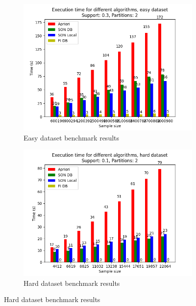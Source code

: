 \documentclass[a4paper]{article}
\begin{document}
	\begin{figure}[h]
		\centering
		\begin{subfigure}[b]{\textwidth}
			\centering
			\includegraphics[width=\textwidth]{1_easy_0,3_2_dataset.png}
         	\caption{Easy dataset benchmark results}
         	\label{fig:1-03sup-2par-ds-e}
		\end{subfigure}
		\hfill		
		\begin{subfigure}[b]{\textwidth}
			\centering
			\includegraphics[width=\textwidth]{1_hard_0,1_2_dataset.png}
         	\caption{Hard dataset benchmark results}
         	\label{fig:1-01sup-2par-ds-h}
		\end{subfigure}
		\hfill
		
	\end{figure}
	
\end{document}
